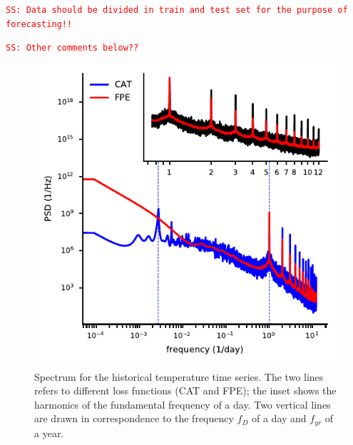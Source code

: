\documentclass[twocolumn,showpacs,preprintnumbers,nofootinbib,prd,
superscriptaddress,10pt]{revtex4-1}
\newcommand{\sschmidt}[1]{{\textcolor{red}{\texttt{SS: #1}} }}
\begin{document}
\sschmidt{Data should be divided in train and test set for the purpose of forecasting!!}

\sschmidt{Other comments below??}

\begin{figure}
	\caption{Spectrum for the historical temperature time series. The two lines refers to different loss functions (CAT and FPE); the inset shows the harmonics of the fundamental frequency of a day. Two vertical lines are drawn in correspondence to the frequency $f_D$ of a day and $f_{yr}$ of a year.}
	\label{fig:temp_spectrum}
	\includegraphics{Images/climate_plots/temp_spectrum.pdf}
\end{figure}
\end{document}
